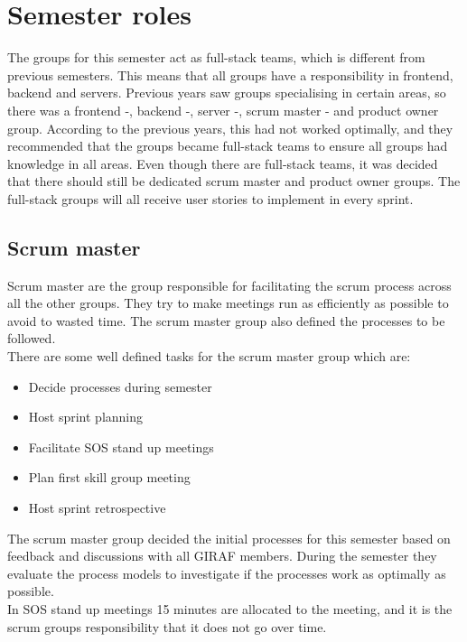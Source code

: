 \section{Semester roles}
The groups for this semester act as full-stack teams, which is different from previous semesters. 
This means that all groups have a responsibility in frontend, backend and servers.
Previous years saw groups specialising in certain areas, so there was a frontend -, backend -, server -, scrum master - and product owner group. 
According to the previous years, this had not worked optimally, and they recommended that the groups became full-stack teams to ensure all groups had knowledge in all areas.
Even though there are full-stack teams, it was decided that there should still be dedicated scrum master and product owner groups. 
The full-stack groups will all receive user stories to implement in every sprint.

\subsection{Scrum master}
Scrum master are the group responsible for facilitating the scrum process across all the other groups.
They try to make meetings run as efficiently as possible to avoid to wasted time.
The scrum master group also defined the processes to be followed.
\\
There are some well defined tasks for the scrum master group which are:
\begin{itemize}
    \item Decide processes during semester
    \item Host sprint planning
    \item Facilitate SOS stand up meetings
    \item Plan first skill group meeting
    \item Host sprint retrospective
\end{itemize}
\noindent
The scrum master group decided the initial processes for this semester based on feedback and discussions with all GIRAF members.
During the semester they evaluate the process models to investigate if the processes work as optimally as possible.
\\
In SOS stand up meetings 15 minutes are allocated to the meeting, and it is the scrum groups responsibility that it does not go over time.

